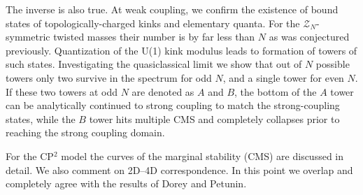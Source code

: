 \documentclass[epsfig,12pt]{article}
\newcommand{\mc}[1]{\mathcal{#1}}
\begin{document}
\begin{titlepage}
	The inverse is also true.
At weak coupling, we confirm the existence of bound states 
	of topologically-charged kinks and elementary quanta. For the $ \mc{Z}_N $-symmetric twisted masses
	their number is by far less than $N$ as was conjectured previously.
	Quantization of the U(1) kink modulus leads to formation of towers of such states. 
	Investigating  the quasiclassical limit we show that out of $N$ possible towers  
	only two survive in the spectrum for odd $ N $, and a single tower for even $ N $.
	If these two towers at odd $N$ are denoted as $A$ and $B$, the bottom of the
	$A$ tower can be analytically continued
	to strong coupling to match the strong-coupling states, while the $B$ tower hits multiple CMS and completely collapses prior to reaching the
	strong coupling domain.

	For the CP$^2$ model the curves of the marginal stability (CMS) are discussed in detail.
	We also comment on 2D--4D correspondence. In this point we overlap and completely agree with
	the results of  Dorey and Petunin.

%
%
%	 
	

\hspace{0.3cm}


\end{titlepage}

\newpage

\tableofcontents
\end{document}
